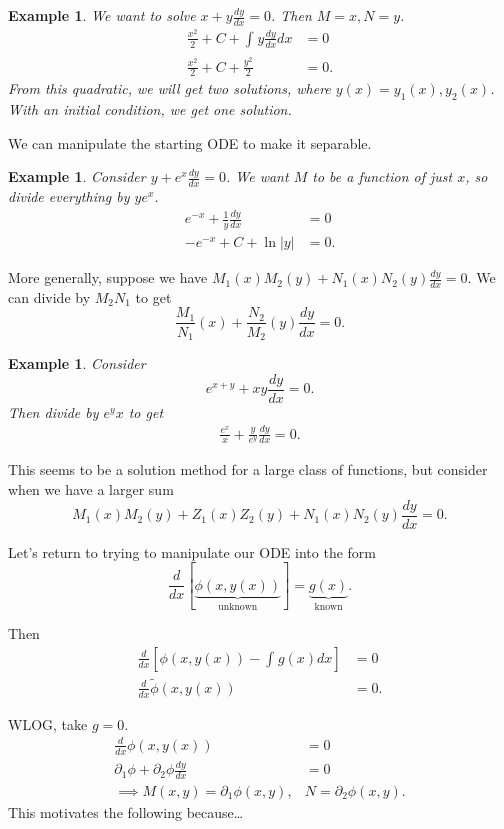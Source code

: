 \documentclass{tufte-handout}
\newtheorem{ex}[thm]{Example}
\theoremstyle{definition}
\begin{document}
\begin{ex}
	We want to solve $x + y \frac{dy}{dx} = 0$. Then $M = x, N= y$.
	\begin{align*}
		\frac{x^2}{2} + C + \int_{} y \frac{dy}{dx} dx &=  0 \\
		\frac{x^2}{2} + C + \frac{y^2}{2} &= 0
	.\end{align*}
	From this quadratic, we will get two solutions, where $y(x) = y_1(x), y_2(x)$. With an initial condition, we get one solution.
\end{ex}

We can manipulate the starting ODE to make it separable.
\begin{ex}
	Consider $y + e^{x}\frac{dy}{dx} = 0$. We want $M$ to be a function of just $x$, so divide everything by $ye^x$.
	\begin{align*}
		e^{-x} + \frac{1}{y} \frac{dy}{dx} &= 0 \\
		-e^{-x} + C + \ln{|y|} &= 0
	.\end{align*}
\end{ex}

More generally, suppose we have $M_1(x)M_2(y) + N_1(x) N_2(y)\frac{dy}{dx} = 0$. We can divide by $M_2N_{1}$ to get \[
	\frac{M_1}{N_1}(x) + \frac{N_2}{M_2}(y) \frac{dy}{dx} = 0
.\] 

\begin{ex}
	Consider \[
		e^{x+y} + xy \frac{dy}{dx} = 0
	.\] Then divide by $e^{y}x$ to get
	\begin{align*}
		\frac{e^x}{x} + \frac{y}{e^y} \frac{dy}{dx} = 0
	.\end{align*}
\end{ex}

This seems to be a solution method for a large class of functions, but consider when we have a larger sum \[
	M_1(x)M_2(y) + Z_1(x)Z_2(y) + N_1(x)N_2(y) \frac{dy}{dx} = 0
.\] 

Let's return to trying to manipulate our ODE into the form \[
	\frac{d}{dx}\left[\underbrace{ \phi(x,y(x))}_{\text{unknown}} \right] = \underbrace{g(x)}_{\text{known}}
.\] 

Then
\begin{align*}
\frac{d}{dx} \left[ \phi(x, y(x)) - \int_{}^{} g(x)dx \right] &= 0 \\
		\frac{d}{dx} \tilde{\phi}(x,y(x)) &= 0
.\end{align*}

WLOG, take $g=0$.
\begin{align*}
	\frac{d}{dx} \phi(x,y(x)) &= 0 \\
	\partial_1 \phi + \partial_2 \phi \frac{dy}{dx} &= 0 \\
	\implies M(x,y) = \partial_1 \phi(x,y), & N = \partial_2 \phi(x,y)
.\end{align*}
This motivates the following because\ldots
\end{document}
